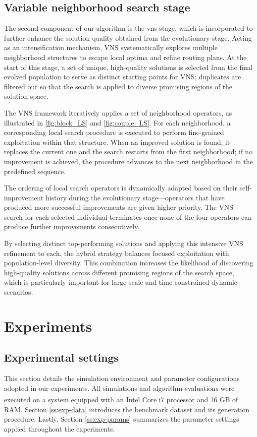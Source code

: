 \documentclass[]{interact}
\begin{document}
\subsection{Variable neighborhood search stage}
The second component of our algorithm is the \gls{vns} stage, which is incorporated to further enhance the solution quality obtained from the evolutionary stage. Acting as an intensification mechanism, VNS systematically explores multiple neighborhood structures to escape local optima and refine routing plans. At the start of this stage, a set of unique, high-quality solutions is selected from the final evolved population to serve as distinct starting points for VNS; duplicates  are filtered out so that the search is applied to diverse promising regions of the solution space.

The VNS framework iteratively applies a set of neighborhood operators, as illustrated in \autoref{fig:block_LS} and \autoref{fig:couple_LS}. For each neighborhood, a corresponding local search procedure is executed to perform fine-grained exploitation within that structure. When an improved solution is found, it replaces the current one and the search restarts from the first neighborhood; if no improvement is achieved, the procedure advances to the next neighborhood in the predefined sequence.

The ordering of local search operators is dynamically adapted based on their self-improvement history during the evolutionary stage—operators that have produced more successful improvements are given higher priority. The VNS search for each selected individual terminates once none of the four operators can produce further improvements consecutively.

By selecting distinct top-performing solutions and applying this intensive VNS refinement to each, the hybrid strategy balances focused exploitation with population-level diversity. This combination increases the likelihood of discovering high-quality solutions across different promising regions of the search space, which is particularly important for large-scale and time-constrained dynamic scenarios.


\section{Experiments}\label{sec:exp}
\subsection{Experimental settings}
This section details the simulation environment and parameter configurations adopted in our experiments. All simulations and algorithm evaluations were executed on a system equipped with an Intel \textsuperscript{\textregistered} Core\textsuperscript{\texttrademark} i7 processor and 16 GB of RAM. Section \ref{ss:exp-data} introduces the benchmark dataset and its generation procedure. Lastly, Section \ref{ss:exp-params} summarizes the parameter settings applied throughout the experiments.
\end{document}

